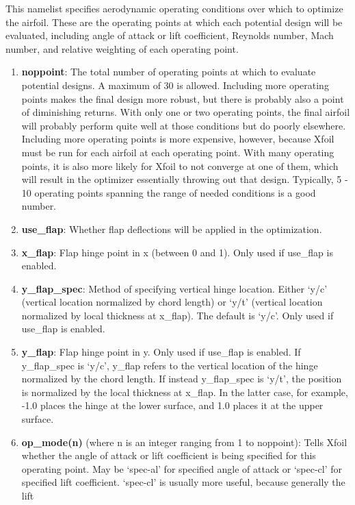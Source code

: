 \documentclass[11pt]{article}
\begin{document}
This namelist specifies aerodynamic operating conditions over which to optimize the
airfoil.  These are the operating points at which each potential design will be evaluated,
including angle of attack or lift coefficient, Reynolds number, Mach number, and
relative weighting of each operating point.

\begin{enumerate}
\item{\textbf{noppoint}: The total number of operating points at which to evaluate
potential designs.  A maximum of 30 is allowed.  Including more operating points makes the
final design more robust, but there is probably also a point of diminishing returns.
With only one or two operating points, the final airfoil will
probably perform quite well at those conditions but do poorly elsewhere.  Including more
operating points is more expensive, however, because Xfoil must be run for each airfoil at
each operating point. With many operating points, it is also more likely for Xfoil to not
converge at one of
them, which will result in the optimizer essentially throwing out that design.
Typically, 5 - 10 operating points spanning the range of needed conditions is a
good number.}
\item{\textbf{use\_flap}: Whether flap deflections will be applied in the optimization.}
\item{\textbf{x\_flap}: Flap hinge point in x (between 0 and 1). Only used if use\_flap is
enabled.}
\item{\textbf{y\_flap\_spec}: Method of specifying vertical hinge location. Either `y/c'
(vertical location normalized by chord length) or `y/t' (vertical location normalized by
local thickness at x\_flap). The default is `y/c'. Only used if use\_flap is enabled.}
\item{\textbf{y\_flap}: Flap hinge point in y. Only used if use\_flap is enabled. If
y\_flap\_spec is `y/c', y\_flap refers to the vertical location of the hinge normalized by
the chord length. If instead y\_flap\_spec is `y/t', the position is normalized by the
local thickness at x\_flap. In the latter case, for example, -1.0 places the hinge at the
lower surface, and 1.0 places it at the upper surface.}
\item{\textbf{op\_mode(n)} (where n is an integer ranging from 1 to noppoint): Tells
Xfoil whether the angle of attack or lift coefficient is being specified for this
operating point.  May be `spec-al' for specified angle of attack or `spec-cl' for
specified lift coefficient. `spec-cl' is usually more useful, because generally the lift
}
\end{enumerate}
\end{document}

